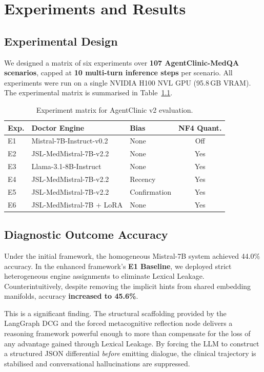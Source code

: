 \chapter{Experiments and Results}
\label{Chapter6}

\section{Experimental Design}

We designed a matrix of six experiments over \textbf{107 AgentClinic-MedQA scenarios}, capped at \textbf{10 multi-turn inference steps} per scenario. All experiments were run on a single NVIDIA H100 NVL GPU (95.8\,GB VRAM). The experimental matrix is summarised in Table~\ref{tab:exp_matrix}.


\begin{table}[H]
\centering
\caption{Experiment matrix for AgentClinic v2 evaluation.}
\label{tab:exp_matrix}
\begin{tabular}{@{}lllc@{}}
\toprule
\textbf{Exp.} & \textbf{Doctor Engine} & \textbf{Bias} & \textbf{NF4 Quant.} \\
\midrule
E1 & Mistral-7B-Instruct-v0.2 & None         & Off \\
E2 & JSL-MedMistral-7B-v2.2   & None         & Yes \\
E3 & Llama-3.1-8B-Instruct    & None         & Yes \\
E4 & JSL-MedMistral-7B-v2.2   & Recency      & Yes \\
E5 & JSL-MedMistral-7B-v2.2   & Confirmation & Yes \\
E6 & JSL-MedMistral-7B + LoRA  & None         & Yes \\
\bottomrule
\end{tabular}
\end{table}

\section{Diagnostic Outcome Accuracy}

Under the initial framework, the homogeneous Mistral-7B system achieved 44.0\% accuracy. In the enhanced framework's \textbf{E1 Baseline}, we deployed strict heterogeneous engine assignments to eliminate Lexical Leakage. Counterintuitively, despite removing the implicit hints from shared embedding manifolds, accuracy \textbf{increased to 45.6\%}.

This is a significant finding. The structural scaffolding provided by the LangGraph DCG and the forced metacognitive reflection node delivers a reasoning framework powerful enough to more than compensate for the loss of any advantage gained through Lexical Leakage. By forcing the LLM to construct a structured JSON differential \textit{before} emitting dialogue, the clinical trajectory is stabilised and conversational hallucinations are suppressed.

